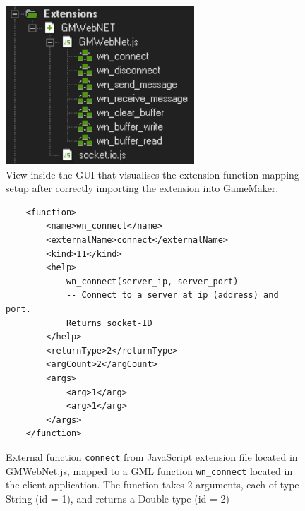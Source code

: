 \documentclass[bsc, 12pt, twoside, singlespacing, parskip, abbrevs, notimes, normalheadings, logo, deptreport]{styles/infthesis}
\begin{document}
\begin{figure}[H]
	\vspace{8em}
	\centering
	\includegraphics[scale=1]{images/extensions_folder.png}
	\caption{View inside the GUI that visualises the extension function mapping setup after correctly importing the extension into GameMaker.}
	\label{fig:extension_folder}
\end{figure}

\begin{figure}[H]
	\centering
	\begin{verbatim}
	<function>
		<name>wn_connect</name>
		<externalName>connect</externalName>
		<kind>11</kind>
		<help>
			wn_connect(server_ip, server_port) 
			-- Connect to a server at ip (address) and port.
			Returns socket-ID
		</help>
		<returnType>2</returnType>
		<argCount>2</argCount>
		<args>
			<arg>1</arg>
			<arg>1</arg>
		</args>
	</function>
	\end{verbatim}
	\caption{External function \texttt{connect} from JavaScript extension file located in GMWebNet.js, mapped to a GML function \texttt{wn\_connect} located in the client application. The function takes 2 arguments, each of type String (id = 1), and returns a Double type (id = 2)}
	\label{fig:xml_mapping}
	\vspace{1em}
\end{figure}
\end{document}
